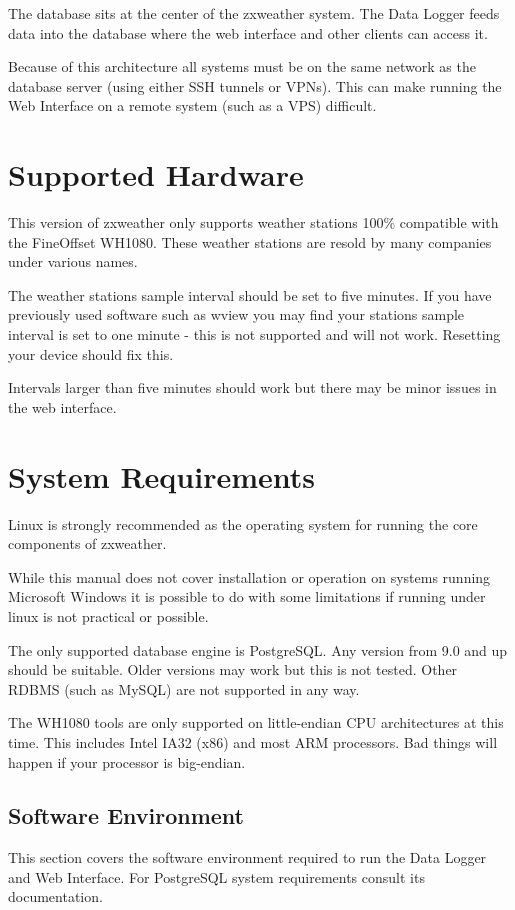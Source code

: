 \documentclass[a4paper,10pt,draft]{book}
\begin{document}
The database sits at the center of the zxweather system. The Data Logger feeds data into the database where the web interface and other clients can access it.

Because of this architecture all systems must be on the same network as the database server (using either SSH tunnels or VPNs). This can make running the Web Interface on a remote system (such as a VPS) difficult.


\section{Supported Hardware}
This version of zxweather only supports weather stations 100\% compatible with the FineOffset WH1080. These weather stations are resold by many companies under various names.

The weather stations sample interval should be set to five minutes. If you have previously used software such as wview you may find your stations sample interval is set to one minute - this is not supported and will not work. Resetting your device should fix this.

Intervals larger than five minutes should work but there may be minor issues in the web interface.

\section{System Requirements}
Linux is strongly recommended as the operating system for running the core components of zxweather. 

While this manual does not cover installation or operation on systems running Microsoft Windows it is possible to do with some limitations if running under linux is not practical or possible.

The only supported database engine is PostgreSQL. Any version from 9.0 and up should be suitable. Older versions may work but this is not tested. Other RDBMS (such as MySQL) are not supported in any way.

The WH1080 tools are only supported on little-endian CPU architectures at this time. This includes Intel IA32 (x86) and most ARM processors. Bad things will happen if your processor is big-endian.

\subsection{Software Environment}
This section covers the software environment required to run the Data Logger and Web Interface. For PostgreSQL system requirements consult its documentation.
\end{document}
